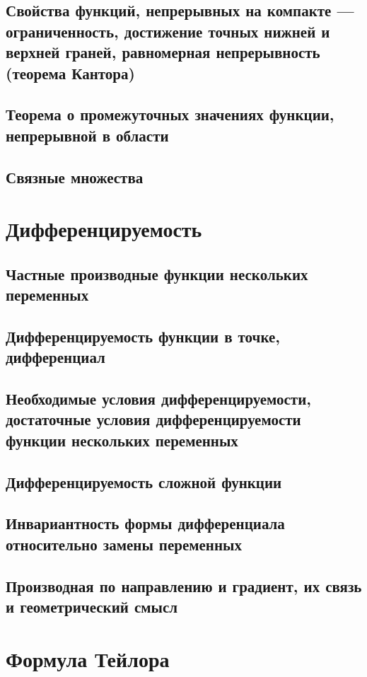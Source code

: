 \documentclass{article}
\begin{document}
\subsection{Свойства функций, непрерывных на компакте — ограниченность, достижение точных нижней и верхней граней, равномерная непрерывность (теорема Кантора)}
\subsection{Теорема о промежуточных значениях функции, непрерывной в области}
\subsection{Связные множества}


\newpage
\section{Дифференцируемость}
\subsection{Частные производные функции нескольких переменных}
\subsection{Дифференцируемость функции в точке, дифференциал}
\subsection{Необходимые условия дифференцируемости, достаточные условия дифференцируемости функции нескольких переменных}
\subsection{Дифференцируемость сложной функции}
\subsection{Инвариантность формы дифференциала относительно замены переменных}
\subsection{Производная по направлению и градиент, их связь и геометрический смысл}


\newpage
\section{Формула Тейлора}
\end{document}

